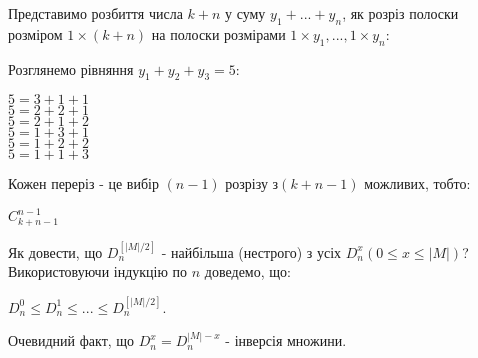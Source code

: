 Представимо розбиття числа $k+n$ у суму $y_1 + ... + y_n$, як розріз полоски розміром $1 \times (k+n)$ на полоски розмірами $1 \times y_1,...,1 \times y_n$:

\begin{example}
Розглянемо рівняння $ y_1 + y_2 + y_3 = 5 $:
\begin{center}
$ 5 = 3 + 1 + 1 $
\\
$ 5 = 2 + 2 + 1 $
\\
$ 5 = 2 + 1 + 2 $
\\
$ 5 = 1 + 3 + 1 $
\\
$ 5 = 1 + 2 + 2 $
\\
$ 5 = 1 + 1 + 3 $
\end{center}
\end{example}

Кожен переріз - це вибір $(n-1)$ розрізу з$(k+n-1)$ можливих, тобто:
\begin{center}
$C_{k+n-1}^{n-1}$
\end{center}

Як довести, що $D_n^{[|M|/2]}$ - найбільша (нестрого) з усіх $D_n^x (0 \leq x \leq |M|)$? Використовуючи індукцію по $n$ доведемо, що:
\begin{center}
$ D_n^0 \leq D_n^1 \leq ... \leq D_n^{[|M|/2]}$.
\end{center}
Очевидний факт, що $D_n^x = D_n^{|M|-x}$ - інверсія множини.


